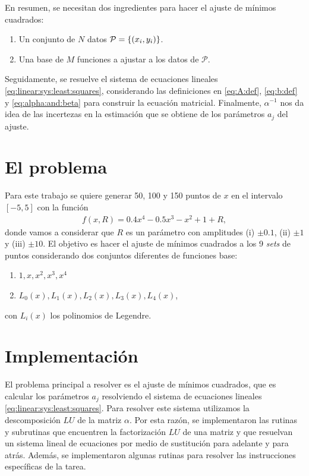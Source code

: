 \documentclass[11pt,letterpaper]{article}
\begin{document}
En resumen, se necesitan dos ingredientes para hacer el ajuste de mínimos
cuadrados:
\begin{enumerate}
\item Un conjunto de $N$ datos $\mathcal{P}=\qty{(x_i,y_i)}$.
\item Una base de $M$ funciones a ajustar a los datos de $\mathcal{P}$.
\end{enumerate}
Seguidamente, se resuelve el sistema de ecuaciones lineales \eqref{eq:linear:sys:least:squares},
considerando las definiciones en \eqref{eq:A:def}, \eqref{eq:b:def} y
\eqref{eq:alpha:and:beta} para construir la ecuación matricial. Finalmente,
$\alpha^{-1}$ nos da idea de las incertezas en la estimación que se 
obtiene de los parámetros $a_j$ del ajuste.

\section{El problema}
Para este trabajo se quiere generar 50, 100 y 150 puntos de $x$ en el
intervalo $[-5,5]$ con la función 
\begin{align}
f(x,R)=0.4x^4-0.5x^3-x^2+1+R,
\end{align}
donde vamos a considerar que $R$ es un parámetro con amplitudes (i) $\pm 0.1$,
(ii) $\pm 1$ y (iii) $\pm 10$. El objetivo es hacer el ajuste de mínimos 
cuadrados a los 9 \textit{sets} de puntos considerando dos conjuntos 
diferentes de funciones base:
\begin{enumerate}
\item $1,x,x^2,x^3,x^4$
\item $L_0(x),L_1(x),L_2(x),L_3(x),L_4(x)$,
\end{enumerate}
con $L_i(x)$ los polinomios de Legendre.

\section{Implementación}
El problema principal a resolver es el ajuste de mínimos cuadrados, que
es calcular los parámetros $a_j$ resolviendo el sistema de ecuaciones
lineales \eqref{eq:linear:sys:least:squares}. Para resolver este sistema
utilizamos la descomposición $LU$ de la matriz $\alpha$. Por esta razón,
se implementaron las rutinas y subrutinas que encuentren la factorización 
$LU$ de una matriz y que resuelvan un sistema lineal de ecuaciones por medio
de sustitución para adelante y para atrás. Además, se implementaron
algunas rutinas para resolver las instrucciones específicas de la tarea.
\end{document}
